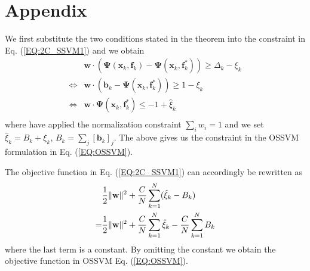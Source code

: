 \documentclass[10pt,journal,compsoc]{newIEEEtran}
\newenvironment{proof}[1][Proof]{\begin{trivlist}
		\item[\hskip \labelsep {\bfseries #1}]}{\end{trivlist}}
\begin{document}
\section*{Appendix}\begin{proof}[Proof of Theorem \ref{THM:2COEQ}]
	We first substitute the two conditions stated in the theorem into the constraint in Eq. (\ref{EQ:2C_SSVM1}) and we obtain	
	\begin{equation}
	\begin{split}
	&\mathbf{w}\cdot(\mathbf{\Psi}(\mathbf{x}_k,\mathbf{f}_k)-\mathbf{\Psi}(\mathbf{x}_k,\mathbf{f}^*_k))\geq  \Delta_k - \xi_k\\
	\Leftrightarrow&\mathbf{w}\cdot(\mathbf{b}_k-\mathbf{\Psi}(\mathbf{x}_k,\mathbf{f}^*_k))\geq  1 - \xi_k\\
	\Leftrightarrow&\mathbf{w}\cdot\mathbf{\Psi}(\mathbf{x}_k,\mathbf{f}_k^*)\leq  -1 +\hat{\xi}_k\\
	\end{split}
	\end{equation}
	where have applied the normalization constraint $\sum_i w_i=1$ and we set $\hat{\xi}_k = {B}_k+ \xi_k$, ${B}_k=\sum_j[\mathbf{b}_k]_j$. The above gives us the constraint in the OSSVM formulation in Eq. (\ref{EQ:OSSVM}).
	
	The objective function in Eq. (\ref{EQ:2C_SSVM1}) can accordingly be rewritten as
	\begin{equation}
	\begin{split}
	&{1\over2}\|\mathbf{w}\|^2 + {C\over N}\sum_{k=1}^N (\hat{\xi}_k-{B}_k)\\
	=& {1\over2}\|\mathbf{w}\|^2 + {C\over N}\sum_{k=1}^N \hat{\xi}_k - {C\over N}\sum_{k=1}^N{B}_k\\
	\end{split}
	\end{equation}
	where the last term is a constant. By omitting the constant we obtain the objective function in OSSVM  Eq. (\ref{EQ:OSSVM}). 
	

\end{proof}
\end{document}
